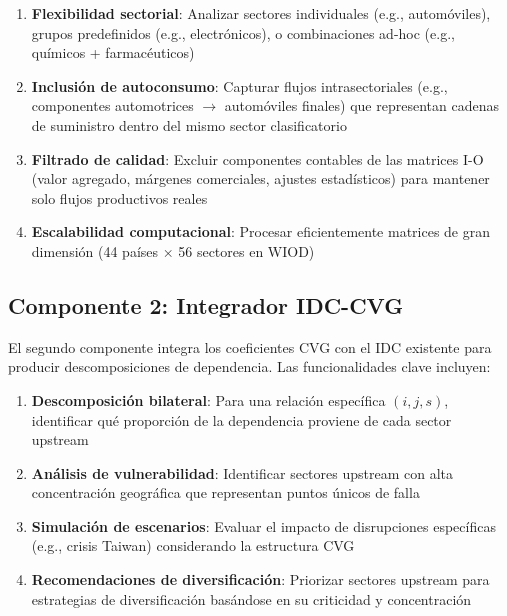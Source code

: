 \documentclass[12pt,a4paper]{article}
\begin{document}
\begin{enumerate}
    \item \textbf{Flexibilidad sectorial}: Analizar sectores individuales (e.g., automóviles), grupos predefinidos (e.g., electrónicos), o combinaciones ad-hoc (e.g., químicos + farmacéuticos)
    
    \item \textbf{Inclusión de autoconsumo}: Capturar flujos intrasectoriales (e.g., componentes automotrices $\rightarrow$ automóviles finales) que representan cadenas de suministro dentro del mismo sector clasificatorio
    
    \item \textbf{Filtrado de calidad}: Excluir componentes contables de las matrices I-O (valor agregado, márgenes comerciales, ajustes estadísticos) para mantener solo flujos productivos reales
    
    \item \textbf{Escalabilidad computacional}: Procesar eficientemente matrices de gran dimensión (44 países × 56 sectores en WIOD)
\end{enumerate}

\subsection{Componente 2: Integrador IDC-CVG}

El segundo componente integra los coeficientes CVG con el IDC existente para producir descomposiciones de dependencia. Las funcionalidades clave incluyen:

\begin{enumerate}
    \item \textbf{Descomposición bilateral}: Para una relación específica $(i,j,s)$, identificar qué proporción de la dependencia proviene de cada sector upstream
    
    \item \textbf{Análisis de vulnerabilidad}: Identificar sectores upstream con alta concentración geográfica que representan puntos únicos de falla
    
    \item \textbf{Simulación de escenarios}: Evaluar el impacto de disrupciones específicas (e.g., crisis Taiwan) considerando la estructura CVG
    
    \item \textbf{Recomendaciones de diversificación}: Priorizar sectores upstream para estrategias de diversificación basándose en su criticidad y concentración
\end{enumerate}
\end{document}
